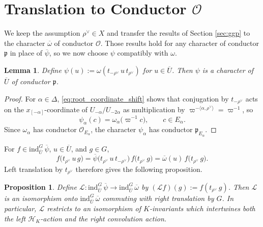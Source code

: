 \documentclass[12pt]{article}
\numberwithin{equation}{section}
\newtheorem{lemma}[theorem]{Lemma}
\newtheorem{proposition}[theorem]{Proposition}
\theoremstyle{definition}
\theoremstyle{remark}
\theoremstyle{plain}
\begin{document}
\section{Translation to Conductor \texorpdfstring{$\mathcal{O}$}{O}}\label{sec:conductorO}

We keep the assumption $\rho^\vee \in X$ and transfer the results of Section \ref{sec:ggp} to the character $\overline{\omega}$ of conductor $\mathcal{O}$. Those results hold for any character of conductor $\mathfrak{p}$ in place of $\overline{\psi}$, so we now choose $\psi$ compatibly with $\omega$.

\begin{lemma}\label{lem:conductor_shift}
Define $\psi(u) := \omega(t_{-\rho^\vee}\, u\, t_{\rho^\vee})$ for $u \in \overline{U}$. Then $\psi$ is a character of $\overline{U}$ of conductor $\mathfrak{p}$.
\end{lemma}
\begin{proof}
For $\alpha\in\Delta$, \eqref{eq:root_coordinate_shift} shows that conjugation by $t_{-\rho^\vee}$ acts on the $x_{[-\alpha]}$-coordinate of $U_{-\alpha}/U_{-2\alpha}$ as multiplication by $\varpi^{-\langle\alpha,\rho^\vee\rangle} = \varpi^{-1}$, so
$$\psi_\alpha(c) = \omega_\alpha\big(\varpi^{-1}c\big), \qquad c \in E_\alpha.$$
Since $\omega_\alpha$ has conductor $\mathcal{O}_{E_\alpha}$, the character $\psi_\alpha$ has conductor $\mathfrak{p}_{E_\alpha}$.
\end{proof}

For $f \in \mathrm{ind}_{\overline{U}}^{G}\,\overline{\psi}$, $u \in \overline{U}$, and $g \in G$,
\begin{equation*}
f\big(t_{\rho^\vee}\, u\, g\big) = \overline{\psi}\big(t_{\rho^\vee}\, u\, t_{-\rho^\vee}\big)\, f\big(t_{\rho^\vee}\, g\big) = \overline{\omega}(u)\, f\big(t_{\rho^\vee}\, g\big).
\end{equation*}
Left translation by $t_{\rho^\vee}$ therefore gives the following proposition.

\begin{proposition}\label{prop:translation_iso}
Define $\mathcal{L} : \mathrm{ind}_{\overline{U}}^{G}\, \overline{\psi} \to \mathrm{ind}_{\overline{U}}^{G}\, \overline{\omega}$ by $(\mathcal{L}f)(g) := f(t_{\rho^\vee}\, g)$. Then $\mathcal{L}$ is an isomorphism onto $\mathrm{ind}_{\overline{U}}^{G}\, \overline{\omega}$ commuting with right translation by $G$. In particular, $\mathcal{L}$ restricts to an isomorphism of $K$-invariants which intertwines both the left $\mathcal{H}_K$-action and the right convolution action.
\end{proposition}
\end{document}
